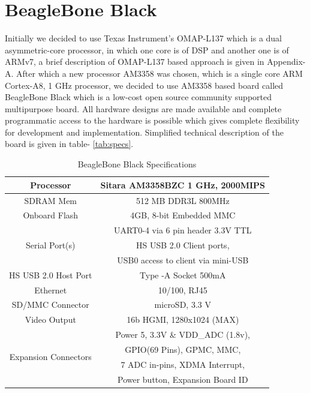 \section{BeagleBone Black}
Initially we decided to use Texas Instrument's OMAP-L137 which is a dual asymmetric-core processor, in which one core is of DSP and another one is of ARMv7, a brief description of OMAP-L137 based approach is given in Appendix-A. After which a new processor AM3358 was chosen, which is a single core ARM Cortex-A8, 1 GHz processor, we decided to use AM3358 based board called BeagleBone Black which is a low-cost open source community supported multipurpose board. All hardware designs are made available and complete programmatic access to the hardware is possible which gives complete flexibility for development and implementation. Simplified technical description of the board is given in table- \ref{tab:specs}.


 \begin{table}[h]
 	\caption{BeagleBone Black Specifications}
		\begin{center}
			\setlength\arrayrulewidth{1pt}
			\begin{tabular}{|c|c|}
				\hline
				Processor & Sitara AM3358BZC 1 GHz, 2000MIPS\\ \hline
				SDRAM Mem & 512 MB DDR3L 800MHz \\ \hline
				Onboard Flash & 4GB, 8-bit Embedded MMC \\ \hline
				\multirow{3}{*}{Serial Port(s)} & UART0-4 via 6 pin header 3.3V TTL\\
				 								& HS USB 2.0 Client ports, \\
				 								& USB0 access to client via mini-USB\\
				\hline
				HS USB 2.0 Host Port & Type -A Socket 500mA \\
				\hline
				Ethernet & 10/100, RJ45 \\
				\hline
				SD/MMC Connector & microSD, 3.3 V\\
				\hline
				Video Output & 16b HGMI, 1280x1024 (MAX)\\
				\hline 
				\multirow{4}{*}{Expansion Connectors} & Power 5, 3.3V \& VDD\_ADC (1.8v),\\
														&  GPIO(69 Pins), GPMC,  MMC, \\
														& 7 ADC in-pins, XDMA Interrupt, \\
														& Power button, Expansion Board ID\\
				\hline
				
			\end{tabular}
		\end{center}
\end{table}

